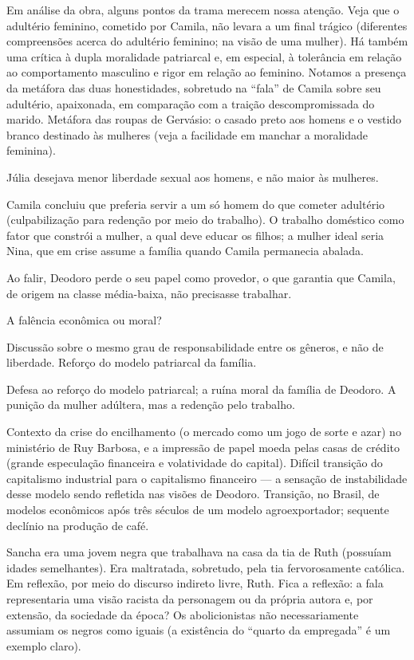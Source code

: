 Em análise da obra, alguns pontos da trama merecem nossa atenção. Veja que o adultério feminino, cometido por Camila, não levara a um final trágico (diferentes compreensões acerca do adultério feminino; na visão de uma mulher). Há também uma crítica à dupla moralidade patriarcal e, em especial, à tolerância em relação ao comportamento masculino e rigor em relação ao feminino. Notamos a presença da metáfora das duas honestidades, sobretudo na ``fala'' de Camila sobre seu adultério, apaixonada, em comparação com a traição descompromissada do marido. Metáfora das roupas de Gervásio: o casado preto aos homens e o vestido branco destinado às mulheres (veja a facilidade em manchar a moralidade feminina).

Júlia desejava menor liberdade sexual aos homens, e não maior às mulheres.

Camila concluiu que preferia servir a um só homem do que cometer adultério (culpabilização para redenção por meio do trabalho). O trabalho doméstico como fator que constrói a mulher, a qual deve educar os filhos; a mulher ideal seria Nina, que em crise assume a família quando Camila permanecia abalada.

Ao falir, Deodoro perde o seu papel como provedor, o que garantia que Camila, de origem na classe média-baixa, não precisasse trabalhar.

A falência econômica ou moral?

Discussão sobre o mesmo grau de responsabilidade entre os gêneros, e não de liberdade. Reforço do modelo patriarcal da família.

Defesa ao reforço do modelo patriarcal; a ruína moral da família de Deodoro. A punição da mulher adúltera, mas a redenção pelo trabalho.

Contexto da crise do encilhamento (o mercado como um jogo de sorte e azar) no ministério de Ruy Barbosa, e a impressão de papel moeda pelas casas de crédito (grande especulação financeira e volatividade do capital). Difícil transição do capitalismo industrial para o capitalismo financeiro — a sensação de instabilidade desse modelo sendo refletida nas visões de Deodoro. Transição, no Brasil, de modelos econômicos após três séculos de um modelo agroexportador; sequente declínio na produção de café.

Sancha era uma jovem negra que trabalhava na casa da tia de Ruth (possuíam idades semelhantes). Era maltratada, sobretudo, pela tia fervorosamente católica. Em reflexão, por meio do discurso indireto livre, Ruth. Fica a reflexão: a fala representaria uma visão racista da personagem ou da própria autora e, por extensão, da sociedade da época? Os abolicionistas não necessariamente assumiam os negros como iguais (a existência do ``quarto da empregada'' é um exemplo claro).